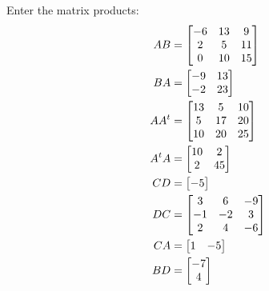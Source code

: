 \documentclass[handout]{ximera}
\begin{document}
\begin{exercise}
\begin{exercise}
Enter the matrix products: 
\begin{align*}
AB &= \begin{bmatrix}    {-6}  &  {13}  &   {9}\\
	  {2}  &  {5}   & {11}\\  
	  {0}  & {10}  &  {15}  \end{bmatrix} \\
BA &= \begin{bmatrix}   {-9}  &  {13}\\   {-2}  &  {23}  \end{bmatrix} \\
AA^t &= \begin{bmatrix}  {13}  &   {5}  &  {10}\\   
	{5}   & {17}  &  {20}\\  
	{10}  &  {20}  &  {25}  \end{bmatrix} \\
A^tA &= \begin{bmatrix}    {10}  &   {2}\\   {2}  &  {45}  \end{bmatrix} \\
CD &= \begin{bmatrix}  {-5} \end{bmatrix} \\
DC &= \begin{bmatrix}  {3}  &   {6}  &  {-9}\\
  {-1}  & {-2}   & {3}\\   {2}  &  {4}   & {-6} \end{bmatrix} \\
CA &= \begin{bmatrix}    {1} &   {-5}  \end{bmatrix} \\
BD &= \begin{bmatrix}  {-7} \\ {4}  \end{bmatrix}
\end{align*}


\end{exercise}
\end{exercise}
\end{document}
